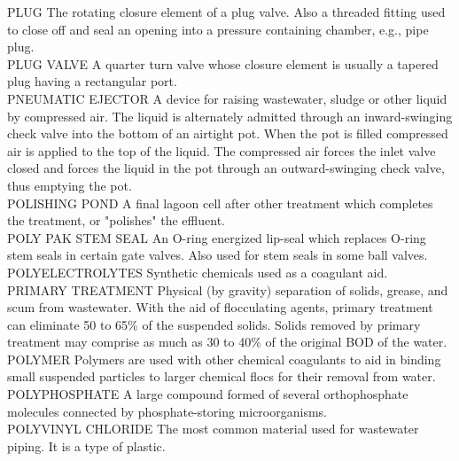 PLUG
The rotating closure element of a plug valve. Also a threaded fitting used to close off and seal an opening into a pressure containing chamber, e.g., pipe plug.
\vspace{0.3cm}\\
PLUG VALVE
A quarter turn valve whose closure element is usually a tapered plug having a rectangular port.
\vspace{0.3cm}\\
PNEUMATIC EJECTOR
A device for raising wastewater, sludge or other liquid by compressed air. The liquid is alternately admitted through an inward-swinging check valve into the bottom of an airtight pot. When the pot is filled compressed air is applied to the top of the liquid. The compressed air forces the inlet valve closed and forces the liquid in the pot through an outward-swinging check valve, thus emptying the pot. 
\vspace{0.3cm}\\
POLISHING POND
A final lagoon cell after other treatment which completes the treatment, or "polishes" the effluent.
\vspace{0.3cm}\\
POLY PAK STEM SEAL
An O-ring energized lip-seal which replaces O-ring stem seals in certain gate valves. Also used for stem seals in some ball valves.
\vspace{0.3cm}\\
POLYELECTROLYTES
Synthetic chemicals used as a coagulant aid.
\vspace{0.3cm}\\
PRIMARY TREATMENT
Physical (by gravity) separation of solids, grease, and scum from wastewater. With the aid of flocculating agents, primary treatment can eliminate 50 to 65\% of the suspended solids. Solids removed by primary treatment may comprise as much as 30 to 40\% of the original BOD of the water.
\vspace{0.3cm}\\
POLYMER
Polymers are used with other chemical coagulants to aid in binding small suspended particles to larger chemical flocs for their removal from water.
\vspace{0.3cm}\\
POLYPHOSPHATE
A large compound formed of several orthophosphate molecules connected by phosphate-storing microorganisms.
\vspace{0.3cm}\\
POLYVINYL CHLORIDE
The most common material used for wastewater piping. It is a type of plastic.
\vspace{0.3cm}\\
